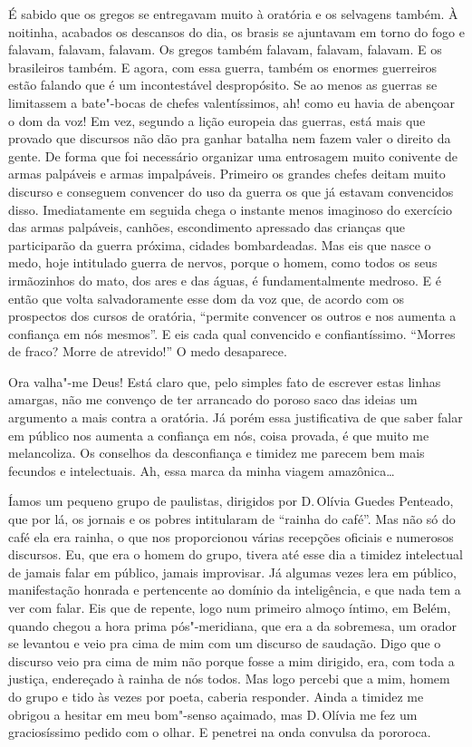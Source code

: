 É sabido que os gregos se entregavam muito à oratória e os selvagens
também. À noitinha, acabados os descansos do dia, os brasis se ajuntavam
em torno do fogo e falavam, falavam, falavam. Os gregos também falavam,
falavam, falavam. E os brasileiros também. E agora, com essa guerra,
também os enormes guerreiros estão falando que é um incontestável
despropósito. Se ao menos as guerras se limitassem a bate"-bocas de
chefes valentíssimos, ah! como eu havia de abençoar o dom da voz! Em
vez, segundo a lição europeia das guerras, está mais que provado que
discursos não dão pra ganhar batalha nem fazem valer o direito da gente.
De forma que foi necessário organizar uma entrosagem muito conivente de
armas palpáveis e armas impalpáveis. Primeiro os grandes chefes deitam
muito discurso e conseguem convencer do uso da guerra os que já estavam
convencidos disso. Imediatamente em seguida chega o instante menos
imaginoso do exercício das armas palpáveis, canhões, escondimento
apressado das crianças que participarão da guerra próxima, cidades
bombardeadas. Mas eis que nasce o medo, hoje intitulado guerra de
nervos, porque o homem, como todos os seus irmãozinhos do mato, dos ares
e das águas, é fundamentalmente medroso. E é então que volta
salvadoramente esse dom da voz que, de acordo com os prospectos dos
cursos de oratória, ``permite convencer os outros e nos aumenta a
confiança em nós mesmos''. E eis cada qual convencido e confiantíssimo.
``Morres de fraco? Morre de atrevido!'' O medo desaparece.

Ora valha"-me Deus! Está claro que, pelo simples fato de escrever estas
linhas amargas, não me convenço de ter arrancado do poroso saco das
ideias um argumento a mais contra a oratória. Já porém essa
justificativa de que saber falar em público nos aumenta a confiança em
nós, coisa provada, é que muito me melancoliza. Os conselhos da
desconfiança e timidez me parecem bem mais fecundos e intelectuais. Ah,
essa marca da minha viagem amazônica\ldots{}

Íamos um pequeno grupo de paulistas, dirigidos por D.\,Olívia Guedes
Penteado, que por lá, os jornais e os pobres intitularam de ``rainha do
café''. Mas não só do café ela era rainha, o que nos proporcionou várias
recepções oficiais e numerosos discursos. Eu, que era o homem do grupo,
tivera até esse dia a timidez intelectual de jamais falar em público,
jamais improvisar. Já algumas vezes lera em público, manifestação
honrada e pertencente ao domínio da inteligência, e que nada tem a ver
com falar. Eis que de repente, logo num primeiro almoço íntimo, em
Belém, quando chegou a hora prima pós"-meridiana, que era a da sobremesa,
um orador se levantou e veio pra cima de mim com um discurso de
saudação. Digo que o discurso veio pra cima de mim não porque fosse a
mim dirigido, era, com toda a justiça, endereçado à rainha de nós todos.
Mas logo percebi que a mim, homem do grupo e tido às vezes por poeta,
caberia responder. Ainda a timidez me obrigou a hesitar em meu bom"-senso
açaimado, mas D.\,Olívia me fez um graciosíssimo pedido com o olhar. E
penetrei na onda convulsa da pororoca.

